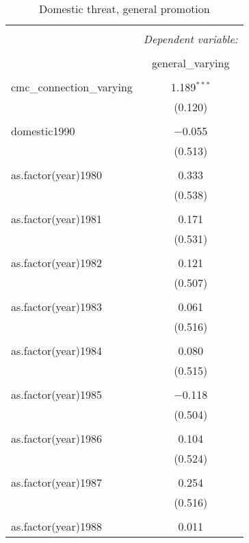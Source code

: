 \documentclass[12pt,letterpaper]{article}
\begin{document}
\begin{table}[!htbp] \centering 
	\caption{Domestic threat, general promotion} 
	\label{} 
	\rmfamily
	\scriptsize 
	\begin{tabular}{@{\extracolsep{5pt}}lc} 
		\\[-1.8ex]\hline 
		\hline \\[-1.8ex] 
		& \multicolumn{1}{c}{\textit{Dependent variable:}} \\ 
		\cline{2-2} 
		\\[-1.8ex] & general\_varying \\ 
		\hline \\[-1.8ex] 
		cmc\_connection\_varying & 1.189$^{***}$ \\ 
		& (0.120) \\ 
		& \\ 
		domestic1990 & $-$0.055 \\ 
		& (0.513) \\ 
		& \\ 
		as.factor(year)1980 & 0.333 \\ 
		& (0.538) \\ 
		& \\ 
		as.factor(year)1981 & 0.171 \\ 
		& (0.531) \\ 
		& \\ 
		as.factor(year)1982 & 0.121 \\ 
		& (0.507) \\ 
		& \\ 
		as.factor(year)1983 & 0.061 \\ 
		& (0.516) \\ 
		& \\ 
		as.factor(year)1984 & 0.080 \\ 
		& (0.515) \\ 
		& \\ 
		as.factor(year)1985 & $-$0.118 \\ 
		& (0.504) \\ 
		& \\ 
		as.factor(year)1986 & 0.104 \\ 
		& (0.524) \\ 
		& \\ 
		as.factor(year)1987 & 0.254 \\ 
		& (0.516) \\ 
		& \\ 
		as.factor(year)1988 & 0.011 \\ 

\end{tabular}
\end{table}
\end{document}

